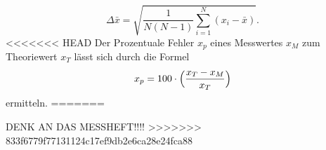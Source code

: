  \begin{equation}
     \Delta\bar{x}=\sqrt{\frac{1}{N(N-1)}\sum_{i=1}^N (x_i-\bar{x})}.
 \end{equation}
<<<<<<< HEAD
\noindent Der Prozentuale Fehler $x_p$ eines
Messwertes $x_M$ zum Theoriewert $x_T$ lässt sich durch
die Formel
\begin{equation}
    x_p=100 \cdot \Bigl(\frac{x_T-x_M}{x_T}\Bigr)
\end{equation}
\noindent ermitteln.
=======





DENK AN DAS MESSHEFT!!!!
>>>>>>> 833f6779f77131124c17ef9db2e6ca28e24fca88
